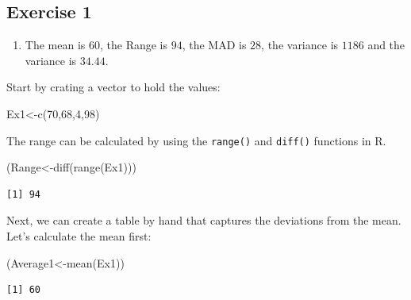\documentclass[
  letterpaper,
  DIV=11,
  numbers=noendperiod]{scrreprt}
\newenvironment{Shaded}{\begin{snugshade}}{\end{snugshade}}
\newcommand{\DecValTok}[1]{\textcolor[rgb]{0.68,0.00,0.00}{#1}}
\newcommand{\FunctionTok}[1]{\textcolor[rgb]{0.28,0.35,0.67}{#1}}
\newcommand{\NormalTok}[1]{\textcolor[rgb]{0.00,0.23,0.31}{#1}}
\newcommand{\OtherTok}[1]{\textcolor[rgb]{0.00,0.23,0.31}{#1}}
\providecommand{\tightlist}{%
  \setlength{\itemsep}{0pt}\setlength{\parskip}{0pt}}\usepackage{longtable,booktabs,array}
\begin{document}
\hypertarget{exercise-1-7}{%
\subsection*{Exercise 1}\label{exercise-1-7}}

\begin{enumerate}
\def\labelenumi{\arabic{enumi}.}
\tightlist
\item
  The mean is \(60\), the Range is \(94\), the MAD is \(28\), the
  variance is \(1186\) and the variance is \(34.44\).
\end{enumerate}

Start by crating a vector to hold the values:

\begin{Shaded}
\begin{Highlighting}[numbers=left,,]
\NormalTok{Ex1}\OtherTok{\textless{}{-}}\FunctionTok{c}\NormalTok{(}\DecValTok{70}\NormalTok{,}\DecValTok{68}\NormalTok{,}\DecValTok{4}\NormalTok{,}\DecValTok{98}\NormalTok{)}
\end{Highlighting}
\end{Shaded}

The range can be calculated by using the \texttt{range()} and
\texttt{diff()} functions in R.

\begin{Shaded}
\begin{Highlighting}[numbers=left,,]
\NormalTok{(Range}\OtherTok{\textless{}{-}}\FunctionTok{diff}\NormalTok{(}\FunctionTok{range}\NormalTok{(Ex1)))}
\end{Highlighting}
\end{Shaded}

\begin{verbatim}
[1] 94
\end{verbatim}

Next, we can create a table by hand that captures the deviations from
the mean. Let's calculate the mean first:

\begin{Shaded}
\begin{Highlighting}[numbers=left,,]
\NormalTok{(Average1}\OtherTok{\textless{}{-}}\FunctionTok{mean}\NormalTok{(Ex1))}
\end{Highlighting}
\end{Shaded}

\begin{verbatim}
[1] 60
\end{verbatim}
\end{document}
